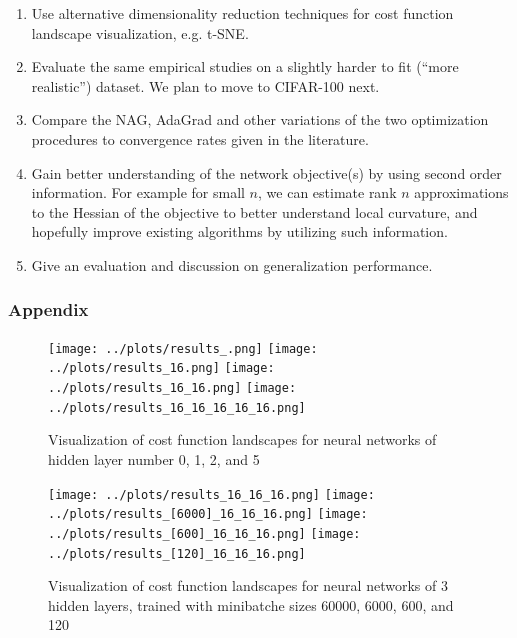 \documentclass[12pt,english]{article}
\newcommand{\1}{\mathbb{I}} %
\begin{document}
\begin{enumerate}

\item Use alternative dimensionality reduction techniques for cost function
landscape visualization, e.g. t-SNE.

\item Evaluate the same empirical studies on a slightly harder to fit (``more realistic'') dataset.
We plan to move to CIFAR-100 next.

\item Compare the NAG, AdaGrad and other variations of the two optimization
procedures to convergence rates given in the literature.

\item Gain better understanding of the network objective(s) by using second
order information.  For example for small $n$, we can estimate rank $n$
approximations to the Hessian of the objective to better understand local
curvature, and hopefully improve existing algorithms by utilizing
such information.

\item Give an evaluation and discussion on generalization performance.

\end{enumerate}

\newpage
\subsubsection*{Appendix}

\begin{figure}[h!]
{\centering
\texttt{[image: ../plots/results\_.png]} 
\texttt{[image: ../plots/results\_16.png]} 
\texttt{[image: ../plots/results\_16\_16.png]}
\texttt{[image: ../plots/results\_16\_16\_16\_16\_16.png]}
}
\caption{Visualization of cost function landscapes for neural networks of hidden layer number 0, 1, 2, and 5} \label{fig:cost_layer}
\end{figure}

\begin{figure}[h!]
{\centering
\texttt{[image: ../plots/results\_16\_16\_16.png]}
\texttt{[image: ../plots/results\_[6000]\_16\_16\_16.png]}
\texttt{[image: ../plots/results\_[600]\_16\_16\_16.png]}
\texttt{[image: ../plots/results\_[120]\_16\_16\_16.png]}
}
\caption{Visualization of cost function landscapes for neural networks of 3 hidden layers, trained with minibatche sizes 60000, 6000, 600, and 120}\label{fig:cost_minibatch}
\end{figure}
\end{document}
